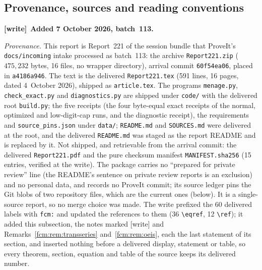 \documentclass[11pt,letterpaper]{article}
\theoremstyle{remark}\newtheorem{remark}[theorem]{Remark}
\newcommand{\file}[1]{\nolinkurl{#1}}
\newenvironment{writenote}[1][]{\par\smallskip\begingroup\small
 \noindent\textbf{[write]}\if\relax\detokenize{#1}\relax\else~\textbf{#1.}\fi\ }%
 {\par\endgroup\smallskip}
\begin{document}
\subsection{Provenance, sources and reading conventions}\label{fcm:sec:provenance}
\begin{writenote}[Added 7 October 2026, batch~113]\raggedright
\emph{Provenance.} This report is Report~221 of the session bundle that
ProveIt's \file{docs/incoming} intake processed as batch~113: the archive
\file{Report221.zip} ($475{,}232$ bytes, 16 files, no wrapper directory),
arrival commit \file{60f54ea06}, placed in \file{a4186a946}. The text is the
delivered \file{Report221.tex} (591 lines, 16 pages, dated 4~October 2026),
shipped as \file{article.tex}. The programs \file{menage.py},
\file{check_exact.py} and \file{diagnostics.py} are shipped under
\file{code/} with the delivered root \file{build.py}; the five receipts (the
four byte-equal exact receipts of the normal, optimized and low-digit-cap
runs, and the diagnostic receipt), the requirements and
\file{source_pins.json} under \file{data/}; \file{README.md} and
\file{SOURCES.md} were delivered at the root, and the delivered
\file{README.md} was staged as the report README and is replaced by it. Not
shipped, and retrievable from the arrival commit: the delivered
\file{Report221.pdf} and the pure checksum manifest \file{MANIFEST.sha256}
(15 entries, verified at the write). The package carries no ``prepared for
private review'' line (the README's sentence on private review reports is an
exclusion) and no personal data, and records no ProveIt commit; its source
ledger pins the Git blobs of two repository files, which are the current ones
(below). It is a single-source report, so no merge choice was made. The write
prefixed the 60 delivered labels with \file{fcm:} and updated the references
to them (36 \verb|\eqref|, 12 \verb|\ref|); it added this subsection, the notes marked [write] and
Remarks~\ref{fcm:rem:transseries} and~\ref{fcm:rem:oeis}, each the last
statement of its section, and inserted nothing before a delivered display,
statement or table, so every theorem, section, equation and table of the
source keeps its delivered number.


\end{writenote}
\end{document}

